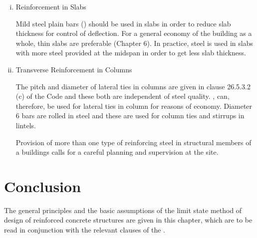 \begin{enumerate}[(i)]
\item Reinforcement in Slabs

Mild steel plain bars (\fetwofivezero) should be used in slabs in order to reduce
slab thickness for control of deflection. For a general economy of the
building as a whole, thin slabs are preferable (Chapter 6). In practice,
{\fefouronefive} steel is used in slabs with more steel provided at the midspan
in order to get less slab thickness.

\item Transverse Reinforcement in Columns

The pitch and diameter of lateral ties in columns are given in clause
26.5.3.2 (c) of the Code and these both are independent of steel quality.
{\fetwofivezero}, {\fetwofivezero} can, therefore, be used for lateral
ties in column for reasons of economy. Diameter 6 \mm bars are rolled in
{\fetwofivezero} steel and these are used for column ties and stirrups in lintels.

Provision of more than one type of reinforcing steel in structural
members of a buildings calls for a careful planning and supervision at
the site.
\end{enumerate}

\section{Conclusion}
The general principles and the basic assumptions of the limit state
method of design of reinforced concrete structures are given in this
chapter, which are to be read in conjunction with the relevant clauses
of the .
